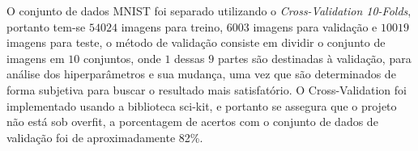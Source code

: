 O conjunto de dados MNIST foi separado utilizando o \textit{Cross-Validation 10-Folds}, portanto tem-se $54024$ imagens para treino, $6003$ imagens para validação e $10019$ imagens para teste, o método de validação consiste em dividir o conjunto de imagens em $10$ conjuntos, onde $1$ dessas $9$ partes são destinadas à validação, para análise dos hiperparâmetros e sua mudança, uma vez que são determinados de forma subjetiva para buscar o resultado mais satisfatório. O Cross-Validation foi implementado usando a biblioteca sci-kit, e portanto se assegura que o projeto não está sob overfit, a porcentagem de acertos com o conjunto de dados de validação foi de aproximadamente 82\%.